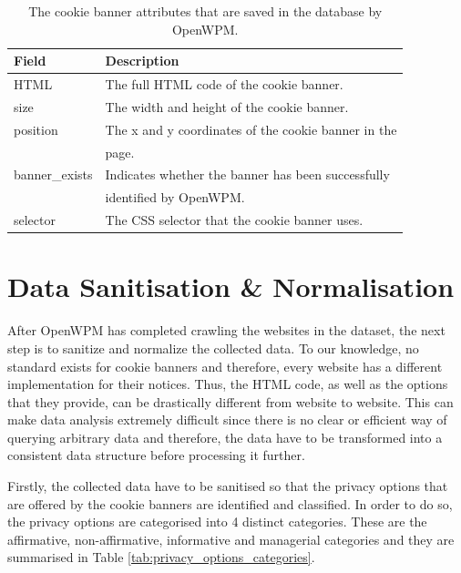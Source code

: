 \documentclass[../main.tex]{subfiles}
\begin{document}
\begin{table}[ht]
    \centering
    \begin{tabular}{@{}ll@{}}
    \toprule
        \textbf{Field} & \textbf{Description}                                   \\ \midrule
        HTML           & The full HTML code of the cookie banner.               \\
        size           & The width and height of the cookie banner.             \\
        position       & The x and y coordinates of the cookie banner in the    \\ 
                       & page.                                                  \\
        banner\_exists & Indicates whether the banner has been successfully     \\ 
                       & identified by OpenWPM.                                 \\
        selector       & The CSS selector that the cookie banner uses.          \\ \bottomrule
    \end{tabular}
    \caption{The cookie banner attributes that are saved in the database by OpenWPM.}
    \label{tab:methods_openwpm_fields}
\end{table}

\section{Data Sanitisation \& Normalisation}

After OpenWPM has completed crawling the websites in the dataset, the next step is to sanitize and normalize the collected data. To our knowledge, no standard exists for cookie banners and therefore, every website has a different implementation for their notices. Thus, the HTML code, as well as the options that they provide, can be drastically different from website to website. This can make data analysis extremely difficult since there is no clear or efficient way of querying arbitrary data and therefore, the data have to be transformed into a consistent data structure before processing it further. 

Firstly, the collected data have to be sanitised so that the privacy options that are offered by the cookie banners are identified and classified. In order to do so, the privacy options are categorised into 4 distinct categories. These are the affirmative, non-affirmative, informative and managerial categories and they are summarised in Table \ref{tab:privacy_options_categories}.
\end{document}
